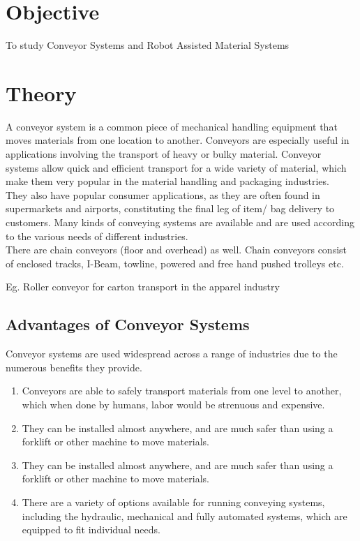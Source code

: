 \documentclass[11pt]{article}
\begin{document}
	
\tableofcontents
\thispagestyle{empty}
\clearpage


\setcounter{page}{1}

\section{Objective}
To study Conveyor Systems and Robot Assisted Material Systems


\section{Theory}


A conveyor system is a common piece of mechanical handling equipment that moves
materials from one location to another. Conveyors are especially useful in applications involving the transport of heavy or bulky material. Conveyor systems allow quick and efficient transport for a wide variety of material, which make them very popular in the material handling and packaging industries.\\

They also have popular consumer applications, as they are often found in supermarkets and airports, constituting the final leg of item/ bag delivery to customers. Many kinds of conveying systems are available and are used according to the various needs of different industries.\\ 
There are chain conveyors (floor and overhead) as well. Chain conveyors consist of enclosed tracks, I-Beam, towline, powered and free hand pushed trolleys etc.

Eg. Roller conveyor for carton transport in the apparel industry

\subsection{Advantages of Conveyor Systems}

Conveyor systems are used widespread across a range of industries due to the numerous benefits they provide.

\begin{enumerate}
	\item Conveyors are able to safely transport materials from one level to another, which when done by humans, labor would be strenuous and expensive.
	\item They can be installed almost anywhere, and are much safer than using a forklift or other machine to move materials.
	\item They can be installed almost anywhere, and are much safer than using a forklift or other machine to move materials.
	\item There are a variety of options available for running conveying systems, including the hydraulic, mechanical and fully automated systems, which are equipped to fit individual needs.
\end{enumerate}
\end{document}
